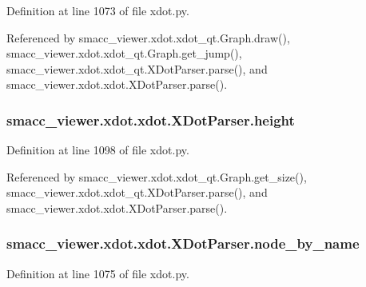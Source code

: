 Definition at line 1073 of file xdot.\+py.



Referenced by smacc\+\_\+viewer.\+xdot.\+xdot\+\_\+qt.\+Graph.\+draw(), smacc\+\_\+viewer.\+xdot.\+xdot\+\_\+qt.\+Graph.\+get\+\_\+jump(), smacc\+\_\+viewer.\+xdot.\+xdot\+\_\+qt.\+X\+Dot\+Parser.\+parse(), and smacc\+\_\+viewer.\+xdot.\+xdot.\+X\+Dot\+Parser.\+parse().

\subsubsection[{\texorpdfstring{height}{height}}]{\setlength{\rightskip}{0pt plus 5cm}smacc\+\_\+viewer.\+xdot.\+xdot.\+X\+Dot\+Parser.\+height}\hypertarget{classsmacc__viewer_1_1xdot_1_1xdot_1_1XDotParser_adc64dc74de1a8ccd5e77455467999e90}{}\label{classsmacc__viewer_1_1xdot_1_1xdot_1_1XDotParser_adc64dc74de1a8ccd5e77455467999e90}


Definition at line 1098 of file xdot.\+py.



Referenced by smacc\+\_\+viewer.\+xdot.\+xdot\+\_\+qt.\+Graph.\+get\+\_\+size(), smacc\+\_\+viewer.\+xdot.\+xdot\+\_\+qt.\+X\+Dot\+Parser.\+parse(), and smacc\+\_\+viewer.\+xdot.\+xdot.\+X\+Dot\+Parser.\+parse().

\subsubsection[{\texorpdfstring{node\+\_\+by\+\_\+name}{node_by_name}}]{\setlength{\rightskip}{0pt plus 5cm}smacc\+\_\+viewer.\+xdot.\+xdot.\+X\+Dot\+Parser.\+node\+\_\+by\+\_\+name}\hypertarget{classsmacc__viewer_1_1xdot_1_1xdot_1_1XDotParser_ab2ae36f76adbaf2c08f05eb5a3fb5557}{}\label{classsmacc__viewer_1_1xdot_1_1xdot_1_1XDotParser_ab2ae36f76adbaf2c08f05eb5a3fb5557}


Definition at line 1075 of file xdot.\+py.



